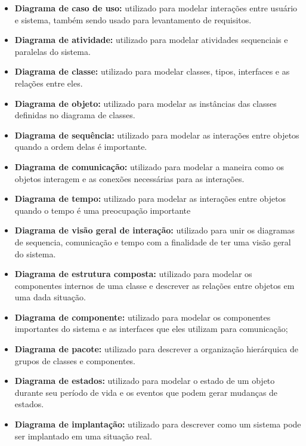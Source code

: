 \begin{itemize}
    \item \textbf{Diagrama de caso de uso:} utilizado para modelar interações entre usuário e sistema, também sendo usado para levantamento de requisitos.
    \item \textbf{Diagrama de atividade:} utilizado para modelar atividades sequenciais e paralelas do sistema.
    \item \textbf{Diagrama de classe:} utilizado para modelar classes, tipos, interfaces e as relações entre eles.
    \item \textbf{Diagrama de objeto:} utilizado para modelar as instâncias das classes definidas no diagrama de classes.
    \item \textbf{Diagrama de sequência:} utilizado para modelar as interações entre objetos quando a ordem delas é importante.
    \item \textbf{Diagrama de comunicação:} utilizado para modelar a maneira como os objetos interagem e as conexões necessárias para as interações.
    \item \textbf{Diagrama de tempo:} utilizado para modelar as interações entre objetos quando o tempo é uma preocupação importante
    \item \textbf{Diagrama de visão geral de interação:} utilizado para unir os diagramas de sequencia, comunicação e tempo com a finalidade de ter uma visão geral do sistema. 
    \item \textbf{Diagrama de estrutura composta:} utilizado para modelar os componentes internos de uma classe e descrever as relações entre objetos em uma dada situação.
    \item \textbf{Diagrama de componente:} utilizado para modelar os componentes importantes do sistema e as interfaces que eles utilizam para comunicação;
    \item \textbf{Diagrama de pacote:} utilizado para descrever a organização hierárquica de grupos de classes e componentes.
    \item \textbf{Diagrama de estados:} utilizado para modelar o estado de um objeto durante seu período de vida e os eventos que podem gerar mudanças de estados.
    \item \textbf{Diagrama de implantação:} utilizado para descrever como um sistema pode ser implantado em uma situação real.
\end{itemize}

